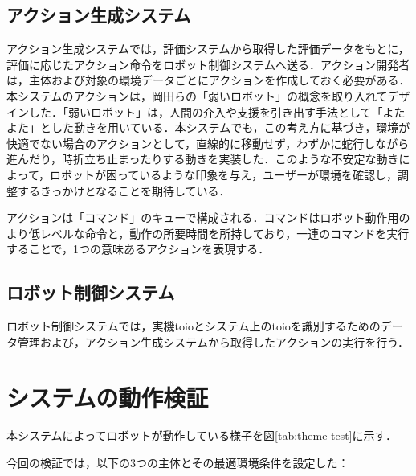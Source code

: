 \documentclass[paper=a4paper,jafontsize=9pt,head_space=15mm,gutter=20mm,
twocolumn,number_of_lines=49, line_length=26zw]{myuarticle}
\begin{document}
\subsection{アクション生成システム}
アクション生成システムでは，評価システムから取得した評価データをもとに，評価に応じたアクション命令をロボット制御システムへ送る．アクション開発者は，主体および対象の環境データごとにアクションを作成しておく必要がある．本システムのアクションは，岡田ら\cite{岡田-2017-弱いロボ}の「弱いロボット」の概念を取り入れてデザインした．「弱いロボット」は，人間の介入や支援を引き出す手法として「よたよた」とした動きを用いている．本システムでも，この考え方に基づき，環境が快適でない場合のアクションとして，直線的に移動せず，わずかに蛇行しながら進んだり，時折立ち止まったりする動きを実装した．このような不安定な動きによって，ロボットが困っているような印象を与え，ユーザーが環境を確認し，調整するきっかけとなることを期待している．

アクションは「コマンド」のキューで構成される．コマンドはロボット動作用のより低レベルな命令と，動作の所要時間を所持しており，一連のコマンドを実行することで，1つの意味あるアクションを表現する．

\subsection{ロボット制御システム}
ロボット制御システムでは，実機toioとシステム上のtoioを識別するためのデータ管理および，アクション生成システムから取得したアクションの実行を行う．

\section{システムの動作検証}
本システムによってロボットが動作している様子を図\ref{tab:theme-test}に示す．

今回の検証では，以下の3つの主体とその最適環境条件を設定した：
\end{document}
